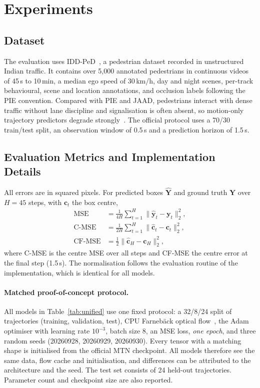 \section{Experiments}\label{sec:results}

\subsection{Dataset}
The evaluation uses IDD-PeD~\citep{iddped2025}, a pedestrian dataset recorded in unstructured Indian traffic. It contains over 5,000 annotated pedestrians in continuous videos of 45\,s to 10\,min, a median ego speed of 30\,km/h, day and night scenes, per-track behavioural, scene and location annotations, and occlusion labels following the PIE convention. Compared with PIE and JAAD, pedestrians interact with dense traffic without lane discipline and signalisation is often absent, so motion-only trajectory predictors degrade strongly~\citep{iddped2025}. The official protocol uses a 70/30 train/test split, an observation window of 0.5\,s and a prediction horizon of 1.5\,s.

\subsection{Evaluation Metrics and Implementation Details}
All errors are in squared pixels. For predicted boxes $\hat{\mathbf{Y}}$ and ground truth $\mathbf{Y}$ over $H{=}45$ steps, with $\mathbf{c}_t$ the box centre,
\begin{align}
\mathrm{MSE}&=\tfrac1{4H}\textstyle\sum_{t=1}^{H}\|\hat{\mathbf{y}}_t-\mathbf{y}_t\|_2^2,\\
\mathrm{C\text{-}MSE}&=\tfrac1{2H}\textstyle\sum_{t=1}^{H}\|\hat{\mathbf{c}}_t-\mathbf{c}_t\|_2^2,\\
\mathrm{CF\text{-}MSE}&=\tfrac12\|\hat{\mathbf{c}}_H-\mathbf{c}_H\|_2^2,
\end{align}
where C-MSE is the centre MSE over all steps and CF-MSE the centre error at the final step (1.5\,s). The normalisation follows the evaluation routine of the implementation, which is identical for all models.

\paragraph{Matched proof-of-concept protocol.} All models in Table~\ref{tab:unified} use one fixed protocol: a 32/8/24 split of trajectories (training, validation, test), CPU Farneb\"ack optical flow~\citep{farneback2003}, the Adam optimiser with learning rate $10^{-3}$, batch size 8, an MSE loss, \emph{one epoch}, and three random seeds (20260928, 20260929, 20260930). Every tensor with a matching shape is initialised from the official MTN checkpoint. All models therefore see the same data, flow cache and initialisation, and differences can be attributed to the architecture and the seed. The test set consists of 24 held-out trajectories. Parameter count and checkpoint size are also reported.

